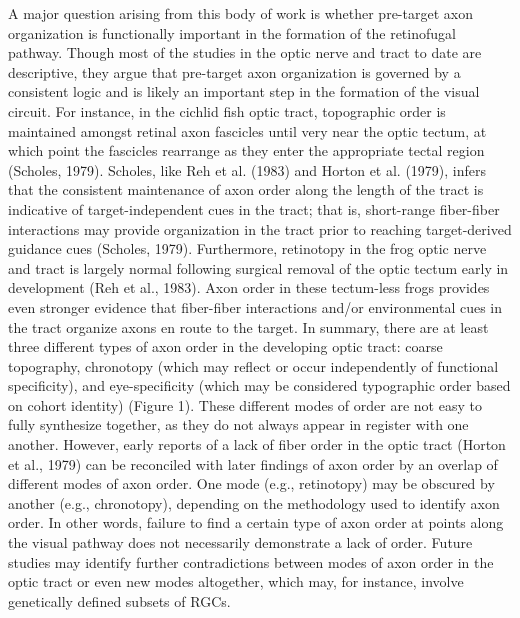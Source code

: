 A major question arising from this body of work is whether pre-target axon organization is functionally important in the formation of the retinofugal pathway. Though most of the studies in the optic nerve and tract to date are descriptive, they argue that pre-target axon organization is governed by a consistent logic and is likely an important step in the formation of the visual circuit. For instance, in the cichlid fish optic tract, topographic order is maintained amongst retinal axon fascicles until very near the optic tectum, at which point the fascicles rearrange as they enter the appropriate tectal region (Scholes, 1979). Scholes, like Reh et al. (1983) and Horton et al. (1979), infers that the consistent maintenance of axon order along the length of the tract is indicative of target-independent cues in the tract; that is, short-range fiber-fiber interactions may provide organization in the tract prior to reaching target-derived guidance cues (Scholes, 1979). Furthermore, retinotopy in the frog optic nerve and tract is largely normal following surgical removal of the optic tectum early in development (Reh et al., 1983). Axon order in these tectum-less frogs provides even stronger evidence that fiber-fiber interactions and/or environmental cues in the tract organize axons en route to the target. 
In summary, there are at least three different types of axon order in the developing optic tract: coarse topography, chronotopy (which may reflect or occur independently of functional specificity), and eye-specificity (which may be considered typographic order based on cohort identity) (Figure 1). These different modes of order are not easy to fully synthesize together, as they do not always appear in register with one another. However, early reports of a lack of fiber order in the optic tract (Horton et al., 1979) can be reconciled with later findings of axon order by an overlap of different modes of axon order. One mode (e.g., retinotopy) may be obscured by another (e.g., chronotopy), depending on the methodology used to identify axon order. In other words, failure to find a certain type of axon order at points along the visual pathway does not necessarily demonstrate a lack of order. Future studies may identify further contradictions between modes of axon order in the optic tract or even new modes altogether, which may, for instance, involve genetically defined subsets of RGCs. 
